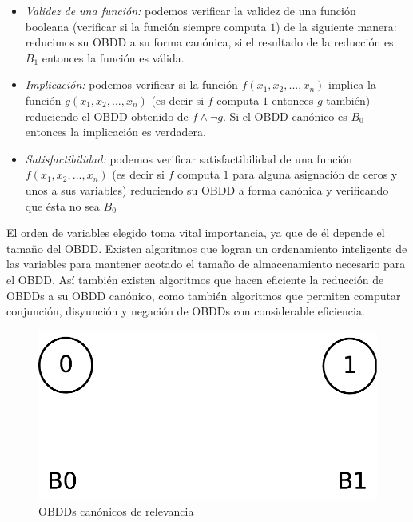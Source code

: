 \documentclass[titlepage, 12pt]{book}
\begin{document}
\begin{itemize}
\item \textit{Validez de una funci\'on:} podemos verificar la validez de una funci\'on\\ booleana (verificar si la funci\'on siempre computa $1$) de la siguiente manera: reducimos su OBDD a su forma can\'onica, si el resultado de la reducci\'on es $B_1$ entonces la funci\'on es v\'alida.
\item \textit{Implicaci\'on:} podemos verificar si la funci\'on $f(x_1,x_2,...,x_n)$ implica la funci\'on $g(x_1,x_2,...,x_n)$ (es decir si $f$ computa $1$ entonces $g$ tambi\'en) reduciendo el OBDD obtenido de $f \wedge \neg g$. Si el OBDD can\'onico es $B_0$ entonces la implicaci\'on es verdadera.
\item \textit{Satisfactibilidad:} podemos verificar satisfactibilidad de una funci\'on\\ $f(x_1,x_2,...,x_n)$ (es decir si $f$ computa $1$ para alguna asignaci\'on de ceros y unos a sus variables) reduciendo su OBDD a forma can\'onica y verificando que \'esta no sea $B_0$
\end{itemize}

El orden de variables elegido toma vital importancia, ya que de \'el depende el tama\~no del OBDD. Existen algoritmos que logran un ordenamiento inteligente de las variables para mantener acotado el tama\~no de almacenamiento necesario para el OBDD. As\'i tambi\'en existen algoritmos que hacen eficiente la reducci\'on de OBDDs a su OBDD can\'onico, como tambi\'en algoritmos que permiten computar conjunci\'on, disyunci\'on y negaci\'on de OBDDs con considerable eficiencia.


\begin{figure}[htp]
  \centering
    \includegraphics[scale=0.5]{Imagenes/canonicos.pdf}
  \caption{OBDDs can\'onicos de relevancia}
  \label{canonicos}
\end{figure}
\end{document}
